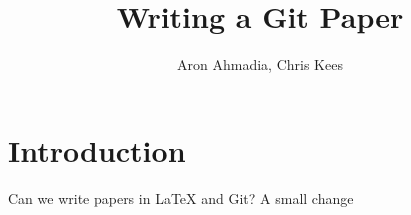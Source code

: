 \documentclass[12pt]{article}
\author{Aron Ahmadia, Chris Kees} \title{Writing a Git Paper}
\begin{document}
\maketitle

\section{Introduction}

Can we write papers in LaTeX and Git?
A small change
\end{document}

